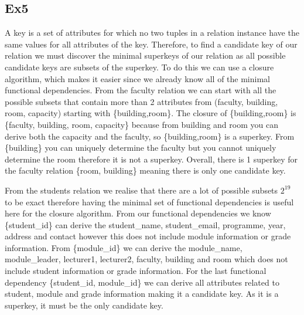 \documentclass[12pt]{article}
\begin{document}
\subsection{Ex5}
A key is a set of attributes for which no two tuples in a relation instance have the same values for all attributes of the key. Therefore, to find a candidate key of our relation we must discover the minimal superkeys of our relation as all possible candidate keys are subsets of the superkey. To do this we can use a closure algorithm, which makes it easier since we already know all of the minimal functional dependencies. From the faculty relation we can start with all the possible subsets that contain more than 2 attributes from (faculty, building, room, capacity) starting with \{building,room\}. The closure of \{building,room\} is \{faculty, building, room, capacity\} because from building and room you can derive both the capacity and the faculty, so \{building,room\} is a superkey. From \{building\} you can uniquely determine the faculty but you cannot uniquely determine the room therefore it is not a superkey. Overall, there is 1 superkey for the faculty relation \{room, building\} meaning there is only one candidate key.

From the students relation we realise that there are a lot of possible subsets \(2^{19}\) to be exact therefore having the minimal set of functional dependencies is useful here for the closure algorithm. From our functional dependencies we know \{student\_id\} can derive the student\_name, student\_email, programme, year, address and contact however this does not include module information or grade information. From \{module\_id\} we can derive the module\_name, module\_leader, lecturer1, lecturer2, faculty, building and room which does not include student information or grade information. For the last functional dependency \{student\_id, module\_id\} we can derive all attributes related to student, module and grade information making it a candidate key. As it is a superkey, it must be the only candidate key. 
\end{document}

